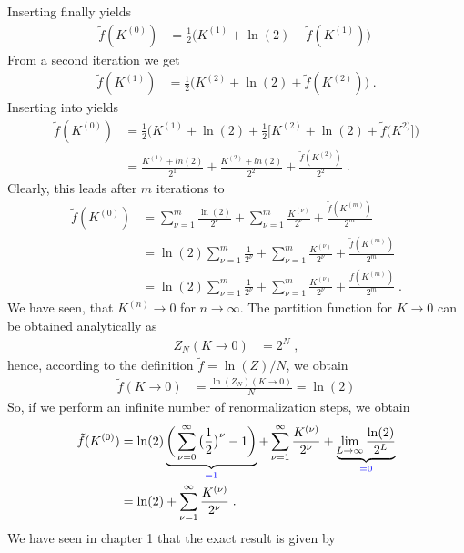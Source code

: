 %
Inserting  finally yields
\begin{align}\label{eq:one:iteration} 
 \tilde f(K^{(0)}) &=\frac{1}{2}\bigg( K^{(1)} + \ln(2)+ \tilde f(K^{(1)})  \bigg)\;
\end{align}
%
From a second iteration we get
\begin{align*}
\tilde f(K^{(1)}) &= \frac{1}{2}\bigg(K^{(2)} + \ln(2)+ \tilde f(K^{(2)}) \bigg)\;.
\end{align*}
%
Inserting into   yields
%
\begin{align*}
\tilde f(K^{(0)}) &= 
\frac{1}{2}
\bigg(
K^{(1)}+\ln(2) +
\frac{1}{2}
\bigg[  
K^{(2)}+\ln(2) + \tilde f(K^{2)}
\bigg]
  \bigg)\\
  &= \frac{K^{(1)}+ln(2)}{2^{1}} +\frac{K^{(2)}+ln(2)}{2^{2}} + \frac{\tilde f(K^{(2)}) }{2^{2}}\;.
\end{align*}
%
Clearly, this leads after $m$ iterations to
\begin{align*}
\tilde f(K^{(0)}) &=\sum_{\nu=1}^{m} \frac{\ln(2)}{2^{\nu}} +\sum_{\nu=1}^{m} \frac{K^{(\nu)}}{2^{\nu}} + \frac{\tilde f(K^{(m)}) }{2^{m}}\\
&=\ln(2)\sum_{\nu=1}^{m} \frac{1}{2^{\nu}}  +\sum_{\nu=1}^{m} \frac{K^{(\nu)}}{2^{\nu}} + \frac{\tilde f(K^{(m)}) }{2^{m}}\\
&=\ln(2)\sum_{\nu=1}^{m} \frac{1}{2^{\nu}}  +\sum_{\nu=1}^{m} \frac{K^{(\nu)}}{2^{\nu}} + \frac{\tilde f(K^{(m)}) }{2^{m}}\;.
\end{align*}
%
We have seen, that $K^{(n)}\to 0$ for $n\to\infty$. The partition function for $K\to 0$ can be
obtained analytically as
%
\begin{align*}
Z_{N}(K\to 0) &= 2^{N}\;,
\end{align*}
%
hence, according to the definition $\tilde f = \ln(Z)/N$, we obtain
%
\begin{align*}
\tilde f(K\to 0) &= \frac{\ln(Z_{N})(K\to 0) }{N} = \ln(2)
\end{align*}
%
So, if we perform an infinite number of  renormalization steps, we obtain
%
\begin{align*}
\tilde f(K^{(0)}) &= \ln(2)
\underbrace{
\bigg( \sum_{\nu=0}^{\infty} \big(\frac{1}{2}\big)^{\nu} -1\bigg)
}_{\color{blue} = 1}
+\sum_{\nu=1}^{\infty} \frac{K^{(\nu)}}{2^{\nu}} + \underbrace{
\lim_{L\to\infty}\frac{\ln(2)}{2^{L}}
}_{\color{blue} = 0}\\
&= \ln(2)+\sum_{\nu=1}^{\infty} \frac{K^{(\nu)}}{2^{\nu}}\;.
\end{align*}
%
We have seen in chapter 1 that the exact result is given by
